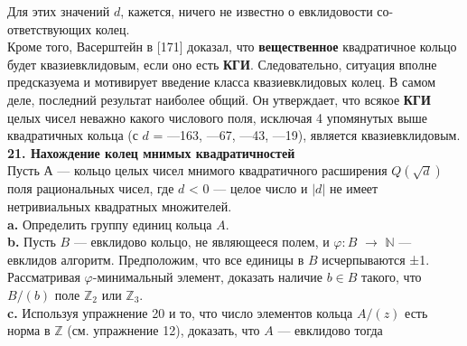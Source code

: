 \noindent Для этих значений $d$, кажется, ничего не известно о евклидовости со-\linebreak ответствующих колец.\\
\hspace*{10pt}Кроме того, Васерштейн в [171] доказал, что \textbf{вещественное} квадратичное кольцо будет квазиевклидовым, если оно есть \textbf{КГИ}. Следовательно, ситуация вполне предсказуема и мотивирует введение класса\linebreak
квазиевклидовых колец. В самом деле, последний результат наиболее\linebreak
общий. Он утверждает, что всякое \textbf{КГИ} целых чисел неважно какого\linebreak
числового поля, исключая 4 упомянутых выше квадратичных кольца\linebreak
(с $d$ = —163, —67, —43, —19), является квазиевклидовым.
\\
 \newline
\noindent\textbf{21. Нахождение колец мнимых квадратичностей}\\
 \newline
\hspace*{10pt}Пусть А — кольцо целых чисел мнимого квадратичного расширения\linebreak
$Q(\sqrt{d})$ поля рациональных чисел, где $d$ < 0 — целое число и $|d|$ не имеет\linebreak
нетривиальных квадратных множителей.\\
 \newline
 \hspace*{10pt}\textbf{a.} Определить группу единиц кольца $A$.\\
 \newline
  \hspace*{10pt}\textbf{b.} Пусть $B$ — евклидово кольцо, не являющееся полем, и\linebreak
$\varphi : B$ $\rightarrow$ $\mathbb {N}$ — евклидов алгоритм. Предположим, что все единицы в\linebreak
$B$ исчерпываются ±1. Рассматривая $\varphi$-минимальный элемент, доказать\linebreak
наличие $b \in B$ такого, что $B/(b)$ поле $\mathbb{Z}_2$ или $\mathbb {Z}_3$.
\\
 \newline
  \hspace*{10pt}\textbf{c.} Используя упражнение 20 и то, что число элементов кольца  $A/(z)$\linebreak
есть норма в $\mathbb {Z}$ (см. упражнение 12), доказать, что $A$ — евклидово тогда\linebreak
